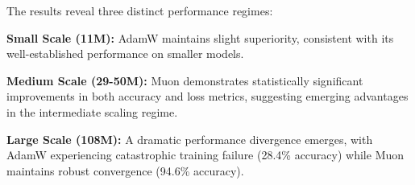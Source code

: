\documentclass[11pt,a4paper]{article}
\begin{document}
\begin{table}[H]
\centering
\caption{Scaling experiment results showing mean ± standard deviation across two random seeds. Statistical significance assessed via independent t-tests.}
\label{tab:scaling_results}
\end{table}

The results reveal three distinct performance regimes:

\textbf{Small Scale (11M):} AdamW maintains slight superiority, consistent with its well-established performance on smaller models.

\textbf{Medium Scale (29-50M):} Muon demonstrates statistically significant improvements in both accuracy and loss metrics, suggesting emerging advantages in the intermediate scaling regime.

\textbf{Large Scale (108M):} A dramatic performance divergence emerges, with AdamW experiencing catastrophic training failure (28.4\% accuracy) while Muon maintains robust convergence (94.6\% accuracy).
\end{document}
